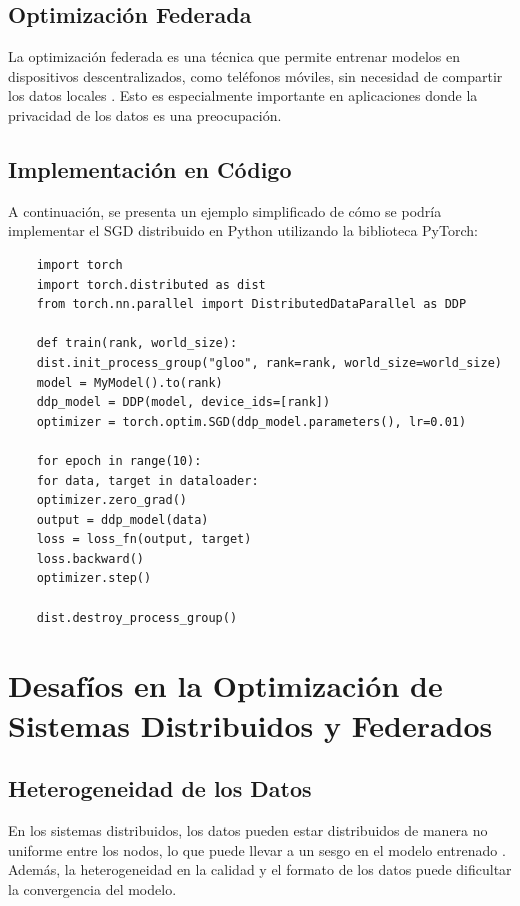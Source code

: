 \subsection{Optimización Federada}
La optimización federada es una técnica que permite entrenar modelos en dispositivos descentralizados, como teléfonos móviles, sin necesidad de compartir los datos locales \cite{mcmahan2017federated}. Esto es especialmente importante en aplicaciones donde la privacidad de los datos es una preocupación.

\subsection{Implementación en Código}
A continuación, se presenta un ejemplo simplificado de cómo se podría implementar el SGD distribuido en Python utilizando la biblioteca PyTorch:

\begin{verbatim}
	import torch
	import torch.distributed as dist
	from torch.nn.parallel import DistributedDataParallel as DDP
	
	def train(rank, world_size):
	dist.init_process_group("gloo", rank=rank, world_size=world_size)
	model = MyModel().to(rank)
	ddp_model = DDP(model, device_ids=[rank])
	optimizer = torch.optim.SGD(ddp_model.parameters(), lr=0.01)
	
	for epoch in range(10):
	for data, target in dataloader:
	optimizer.zero_grad()
	output = ddp_model(data)
	loss = loss_fn(output, target)
	loss.backward()
	optimizer.step()
	
	dist.destroy_process_group()
\end{verbatim}
\section{Desafíos en la Optimización de Sistemas Distribuidos y Federados}
\label{chap:7}

\subsection{Heterogeneidad de los Datos}
En los sistemas distribuidos, los datos pueden estar distribuidos de manera no uniforme entre los nodos, lo que puede llevar a un sesgo en el modelo entrenado \cite{li2019federated}. Además, la heterogeneidad en la calidad y el formato de los datos puede dificultar la convergencia del modelo.

